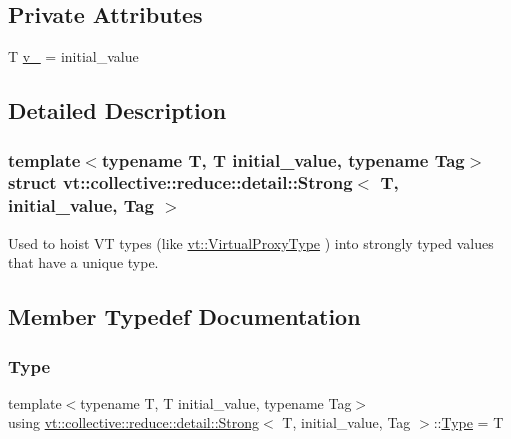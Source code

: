 \subsection*{Private Attributes}
\begin{DoxyCompactItemize}
\item 
T \hyperlink{structvt_1_1collective_1_1reduce_1_1detail_1_1_strong_a1952e524a596e85011084327aacff707}{v\+\_\+} = initial\+\_\+value
\end{DoxyCompactItemize}


\subsection{Detailed Description}
\subsubsection*{template$<$typename T, T initial\+\_\+value, typename Tag$>$\newline
struct vt\+::collective\+::reduce\+::detail\+::\+Strong$<$ T, initial\+\_\+value, Tag $>$}

Used to hoist VT types (like {\ttfamily \hyperlink{namespacevt_a1b417dd5d684f045bb58a0ede70045ac}{vt\+::\+Virtual\+Proxy\+Type}} ) into strongly typed values that have a unique type. 



\subsection{Member Typedef Documentation}
\mbox{\label{structvt_1_1collective_1_1reduce_1_1detail_1_1_strong_a3a5f24fc84aba0dd94b8d2dee9598a92}} 
\subsubsection{\texorpdfstring{Type}{Type}}
{\footnotesize\ttfamily template$<$typename T, T initial\+\_\+value, typename Tag$>$ \\
using \hyperlink{structvt_1_1collective_1_1reduce_1_1detail_1_1_strong}{vt\+::collective\+::reduce\+::detail\+::\+Strong}$<$ T, initial\+\_\+value, Tag $>$\+::\hyperlink{structvt_1_1collective_1_1reduce_1_1detail_1_1_strong_a3a5f24fc84aba0dd94b8d2dee9598a92}{Type} =  T}




